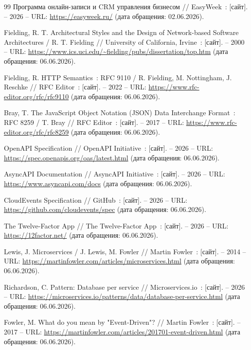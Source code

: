 \begin{thebibliography}{99}
     Программа онлайн-записи и CRM управления бизнесом // EasyWeek~: [сайт]. -- 2026 -- URL: \url{https://easyweek.ru/} (дата обращения: 02.06.2026).

     Fielding, R. T. Architectural Styles and the Design of Network-based Software Architectures / R. T. Fielding // University of California, Irvine~: [сайт]. -- 2000 -- URL: \url{https://www.ics.uci.edu/~fielding/pubs/dissertation/top.htm} (дата обращения: 06.06.2026).

     Fielding, R. HTTP Semantics~: RFC 9110 / R. Fielding, M. Nottingham, J. Reschke // RFC Editor~: [сайт]. -- 2022 -- URL: \url{https://www.rfc-editor.org/rfc/rfc9110} (дата обращения: 06.06.2026).

     Bray, T. The JavaScript Object Notation (JSON) Data Interchange Format~: RFC 8259 / T. Bray // RFC Editor~: [сайт]. -- 2017 -- URL: \url{https://www.rfc-editor.org/rfc/rfc8259} (дата обращения: 06.06.2026).

     OpenAPI Specification // OpenAPI Initiative~: [сайт]. -- 2026 -- URL: \url{https://spec.openapis.org/oas/latest.html} (дата обращения: 06.06.2026).

     AsyncAPI Documentation // AsyncAPI Initiative~: [сайт]. -- 2026 -- URL: \url{https://www.asyncapi.com/docs} (дата обращения: 06.06.2026).

     CloudEvents Specification // GitHub~: [сайт]. -- 2026 -- URL: \url{https://github.com/cloudevents/spec} (дата обращения: 06.06.2026).

     The Twelve-Factor App // The Twelve-Factor App~: [сайт]. -- 2026 -- URL: \url{https://12factor.net/} (дата обращения: 06.06.2026).

     Lewis, J. Microservices / J. Lewis, M. Fowler // Martin Fowler~: [сайт]. -- 2014 -- URL: \url{https://martinfowler.com/articles/microservices.html} (дата обращения: 06.06.2026).

     Richardson, C. Pattern: Database per service // Microservices.io~: [сайт]. -- 2026 -- URL: \url{https://microservices.io/patterns/data/database-per-service.html} (дата обращения: 06.06.2026).

     Fowler, M. What do you mean by "Event-Driven"? // Martin Fowler~: [сайт]. -- 2017 -- URL: \url{https://martinfowler.com/articles/201701-event-driven.html} (дата обращения: 06.06.2026).


\end{thebibliography}
